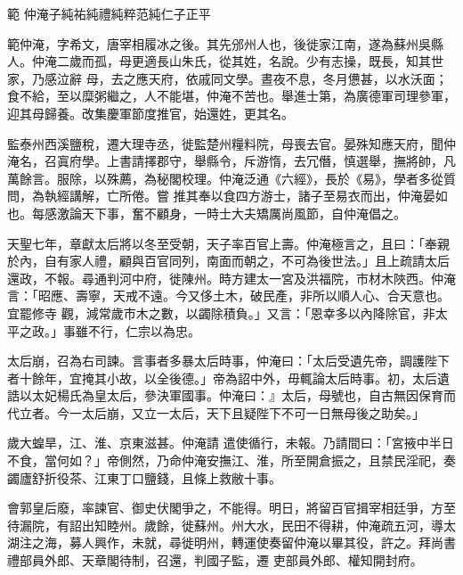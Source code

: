 
\begin{pinyinscope}

 範
 仲淹子純祐純禮純粹范純仁子正平



 範仲淹，字希文，唐宰相履冰之後。其先邠州人也，後徙家江南，遂為蘇州吳縣人。仲淹二歲而孤，母更適長山朱氏，從其姓，名說。少有志操，既長，知其世家，乃感泣辭
 母，去之應天府，依戚同文學。晝夜不息，冬月憊甚，以水沃面；食不給，至以糜粥繼之，人不能堪，仲淹不苦也。舉進士第，為廣德軍司理參軍，迎其母歸養。改集慶軍節度推官，始還姓，更其名。



 監泰州西溪鹽稅，遷大理寺丞，徙監楚州糧料院，母喪去官。晏殊知應天府，聞仲淹名，召寘府學。上書請擇郡守，舉縣令，斥游惰，去冗僭，慎選舉，撫將帥，凡萬餘言。服除，以殊薦，為秘閣校理。仲淹泛通《六經》，長於《易》，學者多從質問，為執經講解，亡所倦。嘗
 推其奉以食四方游士，諸子至易衣而出，仲淹晏如也。每感激論天下事，奮不顧身，一時士大夫矯厲尚風節，自仲淹倡之。



 天聖七年，章獻太后將以冬至受朝，天子率百官上壽。仲淹極言之，且曰：「奉親於內，自有家人禮，顧與百官同列，南面而朝之，不可為後世法。」且上疏請太后還政，不報。尋通判河中府，徙陳州。時方建太一宮及洪福院，市材木陜西。仲淹言：「昭應、壽寧，天戒不遠。今又侈土木，破民產，非所以順人心、合天意也。宜罷修寺
 觀，減常歲市木之數，以蠲除積負。」又言：「恩幸多以內降除官，非太平之政。」事雖不行，仁宗以為忠。



 太后崩，召為右司諫。言事者多暴太后時事，仲淹曰：「太后受遺先帝，調護陛下者十餘年，宜掩其小故，以全後德。」帝為詔中外，毋輒論太后時事。初，太后遺誥以太妃楊氏為皇太后，參決軍國事。仲淹曰：』太后，母號也，自古無因保育而代立者。今一太后崩，又立一太后，天下且疑陛下不可一日無母後之助矣。」



 歲大蝗旱，江、淮、京東滋甚。仲淹請
 遣使循行，未報。乃請間曰：「宮掖中半日不食，當何如？」帝側然，乃命仲淹安撫江、淮，所至開倉振之，且禁民淫祀，奏蠲廬舒折役茶、江東丁口鹽錢，且條上救敝十事。



 會郭皇后廢，率諫官、御史伏閣爭之，不能得。明日，將留百官揖宰相廷爭，方至待漏院，有詔出知睦州。歲餘，徙蘇州。州大水，民田不得耕，仲淹疏五河，導太湖注之海，募人興作，未就，尋徙明州，轉運使奏留仲淹以畢其役，許之。拜尚書禮部員外郎、天章閣待制，召還，判國子監，遷
 吏部員外郎、權知開封府。




\end{pinyinscope}
